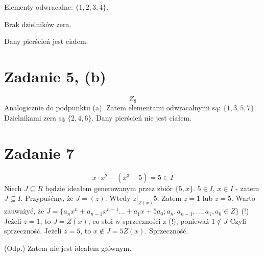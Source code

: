 \documentclass{article}
\begin{document}
Elementy odwracalne: $ \{ 1,2,3,4 \}$. \newline

Brak dzielników zera. \newline

Dany pierścień jest ciałem.

\section{Zadanie 5, (b)}
$$Z_8$$
Analogicznie do podpunktu (a). Zatem elementami odwracalnymi są: $\{ 1,3,5,7 \}$. Dzielnikami zera są $\{2,4,6\}$. \newline
Dany pierścień nie jest ciałem.

\section{Zadanie 7}

$$x \cdot x^2 - (x^3 -5) = 5 \in I$$
Niech $J \subseteq R$ będzie ideałem generowanym przez zbiór $\{ 5,x \}$. $5 \in I$, $x \in I$ - zatem $J \subseteq I$. \newline \newline
Przypuśćmy, że $J = (z)$. Wtedy $z |_{Z(x)} 5$. Zatem $z = 1$ lub $z = 5$. Warto zauważyć, że $J = \{ a_{n}x^{n} + a_{n-1}x^{n-1}...+a_{1}x+5a_{0}; a_{n},a_{n-1},...,a_{1},a_{0} \in Z \}$ (!) \newline \newline
Jeżeli $z = 1$, to $J = Z(x)$, co stoi w sprzeczności z (!), ponieważ $1 \notin J$ Czyli sprzeczność. \newline
Jeżeli $z = 5$, to $x \notin J = 5Z(x)$. Sprzeczność. \newline \newline

(Odp.) Zatem nie jest ideałem głównym.
\end{document}
